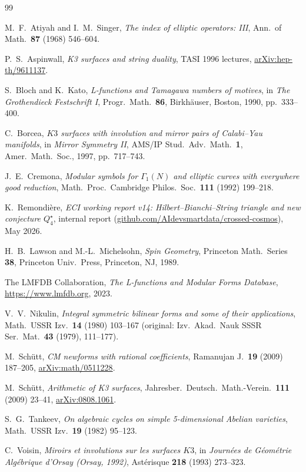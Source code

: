 \documentclass[11pt,a4paper]{article}
\theoremstyle{plain}
\theoremstyle{definition}
\begin{document}
\begin{thebibliography}{99}

M.\ F.\ Atiyah and I.\ M.\ Singer,
\textit{The index of elliptic operators: III},
Ann.\ of Math.\ \textbf{87} (1968) 546--604.

P.\ S.\ Aspinwall,
\textit{K3 surfaces and string duality}, TASI 1996 lectures,
\href{https://arxiv.org/abs/hep-th/9611137}{arXiv:hep-th/9611137}.

S.\ Bloch and K.\ Kato,
\textit{L-functions and Tamagawa numbers of motives},
in \textit{The Grothendieck Festschrift I},
Progr.\ Math.\ \textbf{86}, Birkh\"auser, Boston, 1990, pp.\ 333--400.

C.\ Borcea,
\textit{$K3$ surfaces with involution and mirror pairs of Calabi--Yau
manifolds}, in \textit{Mirror Symmetry II},
AMS/IP Stud.\ Adv.\ Math.\ \textbf{1}, Amer.\ Math.\ Soc., 1997, pp.\ 717--743.

J.\ E.\ Cremona,
\textit{Modular symbols for $\Gamma_{1}(N)$ and elliptic curves with everywhere
good reduction},
Math.\ Proc.\ Cambridge Philos.\ Soc.\ \textbf{111} (1992) 199--218.

K.\ Remondi\`ere,
\textit{ECI working report v14: Hilbert--Bianchi--String triangle and
new conjecture $Q_{4}^{\star}$}, internal report
(\href{https://github.com/AIdevsmartdata/crossed-cosmos}{github.com/AIdevsmartdata/crossed-cosmos}),
May 2026.

H.\ B.\ Lawson and M.-L.\ Michelsohn,
\textit{Spin Geometry},
Princeton Math.\ Series \textbf{38},
Princeton Univ.\ Press, Princeton, NJ, 1989.

The LMFDB Collaboration,
\textit{The L-functions and Modular Forms Database},
\url{https://www.lmfdb.org}, 2023.

V.\ V.\ Nikulin,
\textit{Integral symmetric bilinear forms and some of their applications},
Math.\ USSR Izv.\ \textbf{14} (1980) 103--167
(original: Izv.\ Akad.\ Nauk SSSR Ser.\ Mat.\ \textbf{43} (1979), 111--177).

M.\ Sch\"utt,
\textit{CM newforms with rational coefficients},
Ramanujan J.\ \textbf{19} (2009) 187--205,
\href{https://arxiv.org/abs/math/0511228}{arXiv:math/0511228}.

M.\ Sch\"utt,
\textit{Arithmetic of K3 surfaces},
Jahresber.\ Deutsch.\ Math.-Verein.\ \textbf{111} (2009) 23--41,
\href{https://arxiv.org/abs/0808.1061}{arXiv:0808.1061}.

S.\ G.\ Tankeev,
\textit{On algebraic cycles on simple 5-dimensional Abelian varieties},
Math.\ USSR Izv.\ \textbf{19} (1982) 95--123.

C.\ Voisin,
\textit{Miroirs et involutions sur les surfaces $K3$},
in \textit{Journ\'ees de G\'eom\'etrie Alg\'ebrique d'Orsay (Orsay, 1992)},
Ast\'erisque \textbf{218} (1993) 273--323.

\end{thebibliography}
\end{document}
